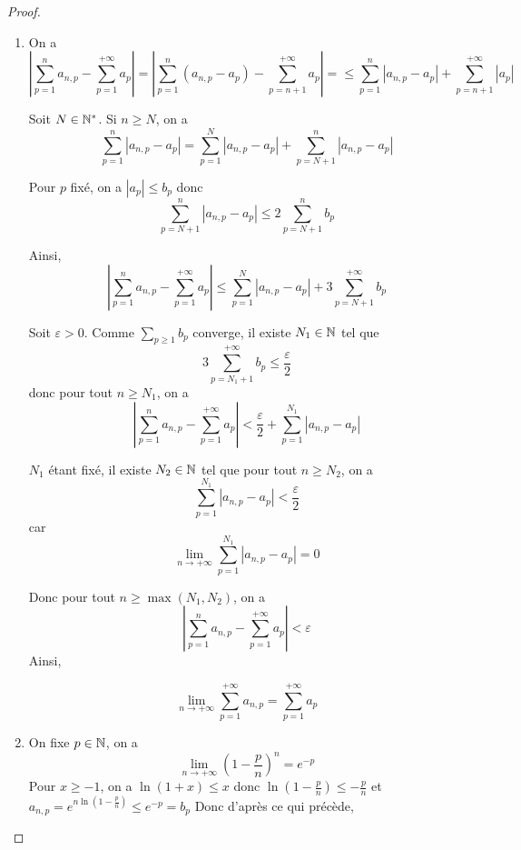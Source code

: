 \begin{proof}
	\phantom{}
	\begin{enumerate}
		\item On a 
		$$\left\lvert\sum_{p=1}^{n}a_{n,p}-\sum_{p=1}^{+\infty}a_{p}\right\rvert=\left\lvert\sum_{p=1}^{n}\left(a_{n,p}-a_{p}\right)-\sum_{p=n+1}^{+\infty}a_{p}\right\rvert=\leqslant\sum_{p=1}^{n}\left\lvert a_{n,p}-a_{p}\right\rvert+\sum_{p=n+1}^{+\infty}\left\lvert a_{p}\right\rvert$$

		Soit $N\in\mathbb{N}^{*}$. Si $n\geqslant N$, on a 
		$$\sum_{p=1}^{n}\left\lvert a_{n,p}-a_{p}\right\rvert=\sum_{p=1}^{N}\left\lvert a_{n,p}-a_{p}\right\rvert+\sum_{p=N+1}^{n}\left\lvert a_{n,p}-a_{p}\right\rvert$$

		Pour $p$ fixé, on a $\left\lvert a_{p}\right\rvert\leqslant b_{p}$ donc 
		$$\sum_{p=N+1}^{n}\left\lvert a_{n,p}-a_{p}\right\rvert\leqslant 2\sum_{p=N+1}^{n} b_{p}$$

		Ainsi, 
		$$\left\lvert\sum_{p=1}^{n}a_{n,p}-\sum_{p=1}^{+\infty}a_{p}\right\rvert\leqslant\sum_{p=1}^{N}\left\lvert a_{n,p}-a_{p}\right\rvert+3\sum_{p=N+1}^{+\infty}b_{p}$$

		Soit $\varepsilon>0$. Comme $\sum_{p\geqslant1}b_{p}$ converge, il existe $N_{1}\in\mathbb{N}$ tel que 
		$$3\sum_{p=N_{1}+1}^{+\infty}b_{p}\leqslant\frac{\varepsilon}{2}$$
		donc pour tout $n\geqslant N_{1}$, on a 
		$$\left\lvert\sum_{p=1}^{n}a_{n,p}-\sum_{p=1}^{+\infty}a_{p}\right\rvert<\frac{\varepsilon}{2}+\sum_{p=1}^{N_{1}}\left\lvert a_{n,p}-a_{p}\right\rvert$$

		$N_{1}$ étant fixé, il existe $N_{2}\in\mathbb{N}$ tel que pour tout $n\geqslant N_{2}$, on a 
		$$\sum_{p=1}^{N_{1}}\left\lvert a_{n,p}-a_{p}\right\rvert<\frac{\varepsilon}{2}$$
		car 
		$$\lim\limits_{n\to+\infty}\sum_{p=1}^{N_{1}}\left\lvert a_{n,p}-a_{p}\right\rvert=0$$

		Donc pour tout $n\geqslant\max\left(N_{1},N_{2}\right)$, on a 
		$$\left\lvert\sum_{p=1}^{n}a_{n,p}-\sum_{p=1}^{+\infty}a_{p}\right\rvert<\varepsilon$$
		Ainsi,

		$$\boxed{\lim\limits_{n\to+\infty}\sum_{p=1}^{+\infty}a_{n,p}=\sum_{p=1}^{+\infty}a_{p}}$$

		\item On fixe $p\in\mathbb{N}$, on a 
		$$\lim\limits_{n\to+\infty}\left(1-\frac{p}{n}\right)^{n}=e^{-p}$$
		Pour $x\geqslant -1$, on a $\ln\left(1+x\right)\leqslant x$ donc $\ln\left(1-\frac{p}{n}\right)\leqslant -\frac{p}{n}$ et $a_{n,p}=e^{n\ln\left(1-\frac{p}{n}\right)}\leqslant e^{-p}=b_{p}$
		Donc d'après ce qui précède, 
		

\end{enumerate}
\end{proof}
